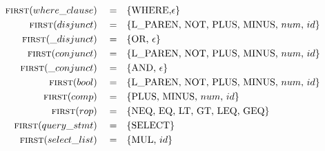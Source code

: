 \documentclass{article}
\begin{document}
\begin{align*}
\textsc{first}(where\_clause) \quad =& \quad\{\text{WHERE,} \epsilon\} \\
\textsc{first}(disjunct) \quad =& \quad\{\text{L\_PAREN, NOT, PLUS, MINUS, }num\text{, }id\} \\
\textsc{first}(\_disjunct) \quad =& \quad\{\text{OR, }\epsilon\} \\
\textsc{first}(conjunct) \quad =& \quad\{\text{L\_PAREN, NOT, PLUS, MINUS, }num\text{, }id\} \\
\textsc{first}(\_conjunct) \quad =& \quad\{\text{AND, }\epsilon\} \\
\textsc{first}(bool) \quad =& \quad\{\text{L\_PAREN, NOT, PLUS, MINUS, }num\text{, }id\} \\
\textsc{first}(comp) \quad =& \quad\{\text{PLUS, MINUS, }num\text{, }id\} \\
\textsc{first}(rop) \quad =& \quad\{\text{NEQ, EQ, LT, GT, LEQ, GEQ}\} \\
\textsc{first}(query\_stmt) \quad =& \quad\{\text{SELECT}\} \\
\textsc{first}(select\_list) \quad =& \quad\{\text{MUL, }id\} \\
\end{align*}
\end{document}

